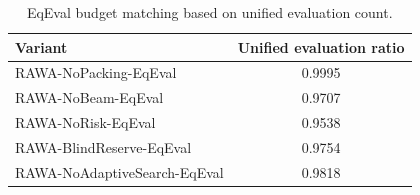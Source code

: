 \begin{table}[!htbp]
\centering
\caption{EqEval budget matching based on unified evaluation count.}
\label{tab:eqeval-budget}
\begin{tabular}{lc}
\hline
Variant & Unified evaluation ratio \\
\hline
RAWA-NoPacking-EqEval & 0.9995 \\
RAWA-NoBeam-EqEval & 0.9707 \\
RAWA-NoRisk-EqEval & 0.9538 \\
RAWA-BlindReserve-EqEval & 0.9754 \\
RAWA-NoAdaptiveSearch-EqEval & 0.9818 \\
\hline
\end{tabular}
\end{table}
